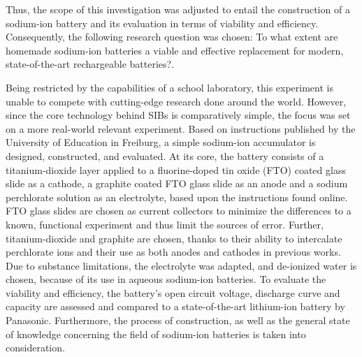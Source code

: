 Thus, the scope of this investigation was adjusted to entail the construction of a sodium-ion battery and its evaluation in terms of viability and efficiency. Consequently, the following research question was chosen: To what extent are homemade sodium-ion batteries a viable and effective replacement for modern, state-of-the-art rechargeable batteries?.

Being restricted by the capabilities of a school laboratory, this experiment is unable to compete with cutting-edge research done around the world. However, since the core technology behind SIBs is comparatively simple, the focus was set on a more real-world relevant experiment. Based on instructions published by the University of Education in Freiburg, a simple sodium-ion accumulator is designed, constructed, and evaluated\cite{Klaus2022}. At its core, the battery consists of a titanium-dioxide layer applied to a fluorine-doped tin oxide (FTO) coated glass slide as a cathode, a graphite coated FTO glass slide as an anode and a sodium perchlorate solution as an electrolyte, based upon the instructions found online\cite{WikipediaFTO2022}.
FTO glass slides are chosen as current collectors to minimize the differences to a known, functional experiment and thus limit the sources of error. Further, titanium-dioxide and graphite are chosen, thanks to their ability to intercalate perchlorate ions and their use as both anodes and cathodes in previous works\cite{Guo2016}.
Due to substance limitations, the electrolyte was adapted, and de-ionized water is chosen, because of its use in aqueous sodium-ion batteries\cite{Che2017}. 
To evaluate the viability and efficiency, the battery's open circuit voltage, discharge curve and capacity are assessed and compared to a state-of-the-art lithium-ion battery by Panasonic\cite{Panasonic2018}. 
Furthermore, the process of construction, as well as the general state of knowledge concerning the field of sodium-ion batteries is taken into consideration.